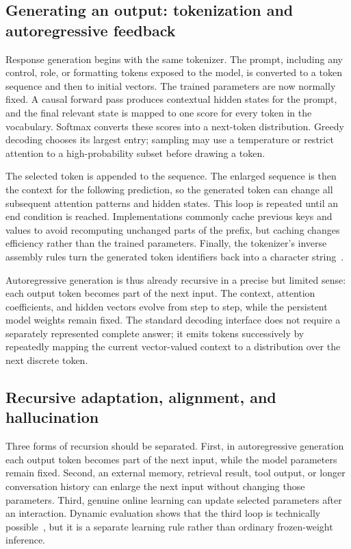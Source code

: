 \documentclass[
  aps,
  reprint,
  superscriptaddress,
  floatfix,
  nofootinbib,
  longbibliography
]{revtex4-2}
\begin{document}
\subsection{Generating an output: tokenization and autoregressive feedback}
\label{sec:prose-generation}

Response generation begins with the same tokenizer.  The prompt, including
any control, role, or formatting tokens exposed to the model, is converted to
a token sequence and then to initial vectors.  The trained parameters are now
normally fixed.  A causal forward pass produces contextual hidden states for
the prompt, and the final relevant state is mapped to one score for every
token in the vocabulary.  Softmax converts these scores into a next-token
distribution.  Greedy decoding chooses its largest entry; sampling may use a
temperature or restrict attention to a high-probability subset before drawing
a token.

The selected token is appended to the sequence.  The enlarged sequence is
then the context for the following prediction, so the generated token can
change all subsequent attention patterns and hidden states.  This loop is
repeated until an end condition is reached.  Implementations commonly cache
previous keys and values to avoid recomputing unchanged parts of the prefix,
but caching changes efficiency rather than the trained parameters.  Finally,
the tokenizer's inverse assembly rules turn the generated token identifiers
back into a character string~\cite{Brown2020May}.

Autoregressive generation is thus already recursive in a precise but limited
sense: each output token becomes part of the next input.  The context,
attention coefficients, and hidden vectors evolve from step to step, while
the persistent model weights remain fixed.  The standard decoding interface
does not require a separately represented complete answer; it emits tokens
successively by repeatedly mapping the current vector-valued context to a
distribution over the next discrete token.

\subsection{Recursive adaptation, alignment, and hallucination}
\label{sec:prose-online}

Three forms of recursion should be separated.  First, in autoregressive
generation each output token becomes part of the next input, while the model
parameters remain fixed.  Second, an external memory, retrieval result, tool
output, or longer conversation history can enlarge the next input without
changing those parameters.  Third, genuine online learning can update selected
parameters after an interaction.  Dynamic evaluation shows that the third loop
is technically possible~\cite{rannentriki2024dynamic}, but it is a separate
learning rule rather than ordinary frozen-weight inference.
\end{document}
